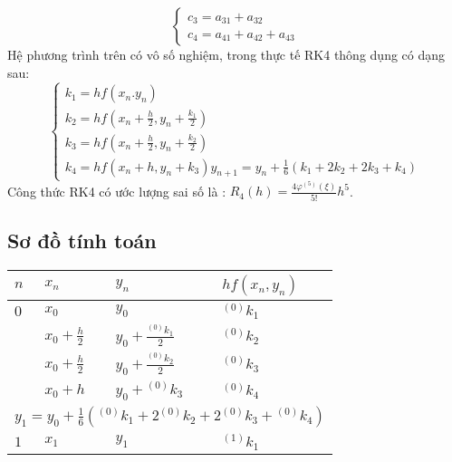 \begin{enumerate}[label=\alph*)]
$$\begin{cases}
			c_3=a_{31}+a_{32}\\
			c_4=a_{41}+a_{42}+a_{43}
		\end{cases}$$
		Hệ phương trình trên có vô số nghiệm, trong thực tế RK4 thông dụng có dạng sau:
		$$\begin{cases}
			k_1=hf\left(x_n. y_n\right)\\
			k_2=hf\left(x_n+\frac h2,y_n+\frac{k_1}{2}\right)\\
			k_3=hf\left(x_n+\frac h2,y_n+\frac{k_2}{2}\right)\\
			k_4=hf\left(x_n+h,y_n+k_3\right)
			y_{n+1}=y_n+\frac16(k_1+2k_2+2k_3+k_4)
		\end{cases}$$
		Công thức RK4 có ước lượng sai số là : $R_4(h)=\frac{4\varphi^{(5)}\left(\xi\right)}{5!}h^5$.
\end{enumerate}

\subsection{Sơ đồ tính toán}
\begin{center}\begin{tabular}{|l|l|l|l|}
\hline
$n$ & $x_n$          & $y_n$                       & $hf(x_n,y_n)$ \\
\hline
$0$ & $x_0$          & $y_0$                       & ${}^{(0)}k_1$\\
    & $x_0+\frac h2$ & $y_0+\frac{{}^{(0)}k_1}{2}$ & ${}^{(0)}k_2$\\
    & $x_0+\frac h2$ & $y_0+\frac{{}^{(0)}k_2}{2}$ & ${}^{(0)}k_3$\\
    & $x_0+h$        & $y_0+{}^{(0)}k_3$           & ${}^{(0)}k_4$\\
\hline
\multicolumn{4}{|c|}{\tabularrowheight{24pt}$y_1=y_0+\frac16\left({}^{(0)}k_1+2{}^{(0)}k_2+2{}^{(0)}k_3+{}^{(0)}k_4\right)$}\\
\hline
$1$ & $x_1$          & $y_1$                       & ${}^{\left(1\right)}k_1$\\
\hline
\end{tabular}\end{center}
